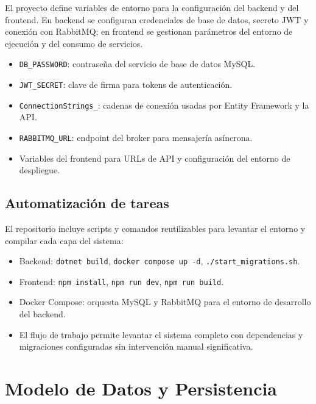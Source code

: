\documentclass[12pt,letterpaper]{article}
\begin{document}
	El proyecto define variables de entorno para la configuración del backend y del frontend. En backend se configuran credenciales de base de datos, secreto JWT y conexión con RabbitMQ; en frontend se gestionan parámetros del entorno de ejecución y del consumo de servicios.
	
	\begin{itemize}
		\item \texttt{DB\_PASSWORD}: contraseña del servicio de base de datos MySQL.
		\item \texttt{JWT\_SECRET}: clave de firma para tokens de autenticación.
		\item \texttt{ConnectionStrings\_\*}: cadenas de conexión usadas por Entity Framework y la API.
		\item \texttt{RABBITMQ\_URL}: endpoint del broker para mensajería asíncrona.
		\item Variables del frontend para URLs de API y configuración del entorno de despliegue.
	\end{itemize}
	
	\subsection{Automatización de tareas}
	
	El repositorio incluye scripts y comandos reutilizables para levantar el entorno y compilar cada capa del sistema:
	
	\begin{itemize}
		\item Backend: \texttt{dotnet build}, \texttt{docker compose up -d}, \texttt{./start\_migrations.sh}.
		\item Frontend: \texttt{npm install}, \texttt{npm run dev}, \texttt{npm run build}.
		\item Docker Compose: orquesta MySQL y RabbitMQ para el entorno de desarrollo del backend.
		\item El flujo de trabajo permite levantar el sistema completo con dependencias y migraciones configuradas sin intervención manual significativa.
	\end{itemize}
	













	\section{Modelo de Datos y Persistencia}
\end{document}
